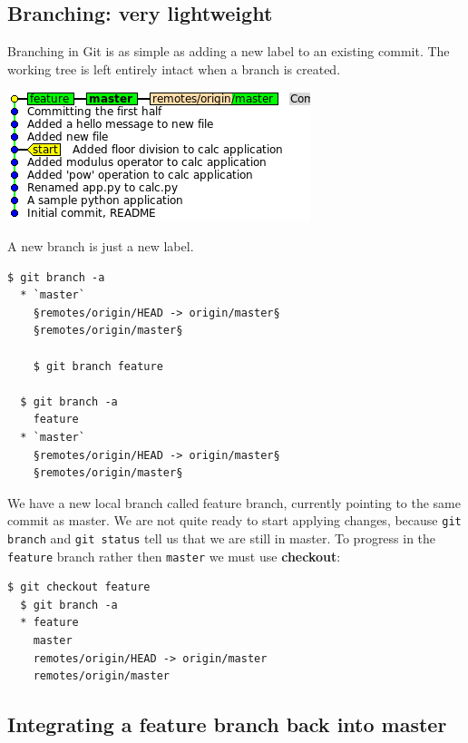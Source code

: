 \documentclass{../common/tufte-latex/tufte-handout}
\begin{document}
\subsection{Branching: very lightweight}

Branching in Git is as simple as adding a new label to an existing commit.
The working tree is left entirely intact when a branch is created.
\begin{marginfigure}%
  \centering
  \includegraphics[width=\linewidth]{gitbranch-feature.png}
  \label{fig:gitbranch-feature}
  \caption{A new branch is just a new label.}
\end{marginfigure}
\begin{lstlisting}[style=BashInputStyle]
  $ git branch -a
  * `master`
    §remotes/origin/HEAD -> origin/master§
    §remotes/origin/master§

    $ git branch feature

  $ git branch -a
    feature
  * `master`
    §remotes/origin/HEAD -> origin/master§
    §remotes/origin/master§
\end{lstlisting}

We have a new local branch called feature branch, currently pointing to the same commit as master.
We are not quite ready to start applying changes, because \texttt{git branch} and \texttt{git status} tell us that we are still in master.
To progress in the \texttt{feature} branch rather then \texttt{master} we must use \textbf{checkout}:

\begin{lstlisting}[style=BashInputStyle]
  $ git checkout feature
  $ git branch -a
  * feature
    master
    remotes/origin/HEAD -> origin/master
    remotes/origin/master
\end{lstlisting}

\subsection{Integrating a feature branch back into master}
\end{document}
